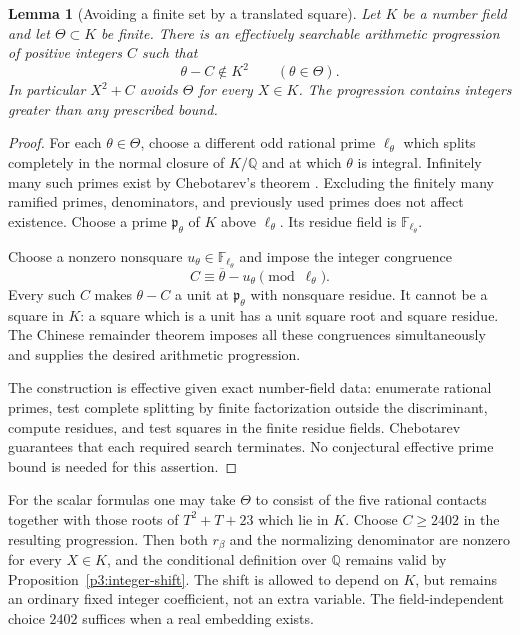 \documentclass[11pt]{article}
\newtheorem{lemma}[theorem]{Lemma}
\theoremstyle{definition}
\begin{document}
\begin{lemma}[Avoiding a finite set by a translated square]
\label{p3:finite-square-avoidance}
Let $K$ be a number field and let $\Theta\subset K$ be finite.
There is an effectively searchable arithmetic progression of positive
integers $C$ such that
\[
                  \theta-C\notin K^2
                       \qquad(\theta\in\Theta).
\]
In particular $X^2+C$ avoids $\Theta$ for every $X\in K$. The
progression contains integers greater than any prescribed bound.
\end{lemma}
\begin{proof}
For each $\theta\in\Theta$, choose a different odd rational prime
$\ell_\theta$ which splits completely in the normal closure of
$K/\mathbb Q$ and at which $\theta$ is integral. Infinitely many
such primes exist by Chebotarev's theorem
\cite[Section~2.1, Theorem~1]{p2lbSerre1981}. Excluding the finitely
many ramified primes, denominators, and previously used primes
does not affect existence. Choose a prime $\mathfrak p_\theta$
of $K$ above $\ell_\theta$. Its residue field is
$\mathbb F_{\ell_\theta}$.

Choose a nonzero nonsquare
$u_\theta\in\mathbb F_{\ell_\theta}$ and impose the integer
congruence
\[
                C\equiv\overline\theta-u_\theta
                       \pmod{\ell_\theta}.
\]
Every such $C$ makes $\theta-C$ a unit at
$\mathfrak p_\theta$ with nonsquare residue. It cannot be a
square in $K$: a square which is a unit has a unit square root
and square residue. The Chinese remainder theorem imposes all
these congruences simultaneously and supplies the desired
arithmetic progression.

The construction is effective given exact number-field data:
enumerate rational primes, test complete splitting by finite
factorization outside the discriminant, compute residues, and
test squares in the finite residue fields. Chebotarev guarantees
that each required search terminates. No conjectural effective
prime bound is needed for this assertion.
\end{proof}

For the scalar formulas one may take $\Theta$ to consist of the
five rational contacts together with those roots of
$T^2+T+23$ which lie in $K$. Choose $C\ge2402$ in the
resulting progression. Then both $r_\beta$ and the normalizing
denominator are nonzero for every $X\in K$, and the conditional
definition over $\mathbb Q$ remains valid by
Proposition~\ref{p3:integer-shift}. The shift is allowed to depend
on $K$, but remains an ordinary fixed integer coefficient, not
an extra variable. The field-independent choice $2402$ suffices
when a real embedding exists.
\end{document}
